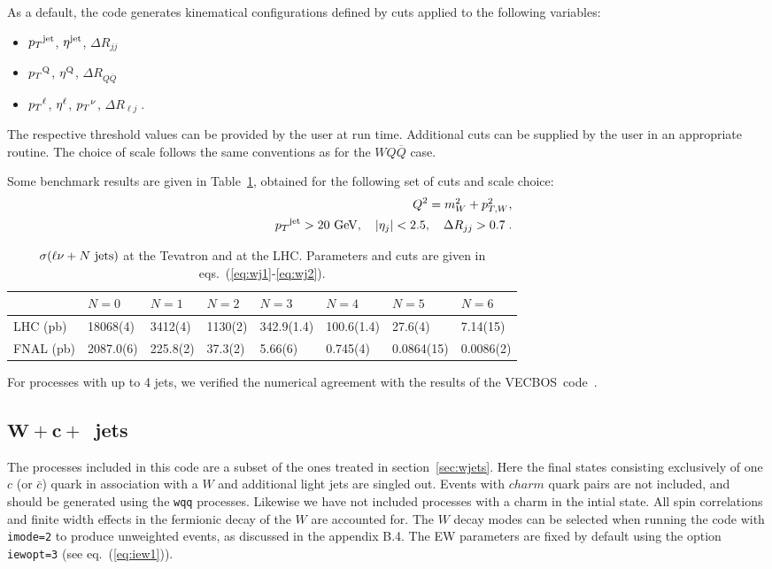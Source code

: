 \documentclass[paper]{JHEP3}
\newcommand{\gev}{\mbox{GeV}}
\newcommand{\ccaption}[2]{
    \begin{center}
    \parbox{0.85\textwidth}{
      \caption[#1]{\small{{#2}}}
      }
    \end{center}
    }
\def    \ba             {\begin{eqnarray}}
\def    \ea             {\end{eqnarray}}
\def    \gev            {\mbox{$\mathrm{GeV}$}}
\def    \Qbar   {\overline{Q}}
\def    \mWsq             {\mbox{$m_W^2$} }
\def    \pt             {\mbox{$p_T$}}
\def    \ptWsq           {\mbox{$p^2_{T,W}$}}
\def\vecbos{{\small VECBOS}}
\begin{document}
As a default, the code generates kinematical configurations defined by
cuts applied to the following variables:
\begin{itemize}
\item $\pt^{\rm jet}$, $\eta^{\rm jet}$, $\Delta R_{jj}$
\item $\pt^{\rm Q}$, $\eta^{\rm Q}$, $\Delta R_{Q\Qbar}$ 
\item $\pt^{\rm \ell}$, $\eta^{\rm \ell}$, $\pt^{\rm \nu}$, $\Delta
  R_{\ell j} \; . $
\end{itemize}
The respective threshold values can be provided by the user at run
time. Additional cuts can be supplied by the user in an appropriate
routine. 
The choice of scale follows the same conventions as for the $WQ\Qbar$
case.


Some benchmark results are given in Table~\ref{tab:wjxs}, obtained
for the following set of cuts and scale choice:
\ba \label{eq:wj1}
&& Q^2 = \mWsq + \ptWsq,
\\
        && \pt^{\rm jet}>20~\gev, \quad \vert \eta_j\vert < 2.5, \quad \Delta
        R_{jj} >0.7 \; .
\label{eq:wj2}
\ea

{\renewcommand{\arraystretch}{1.2}
\begin{table}
\begin{center}
\begin{tabular}{||l|l|l|l|l|l|l|l||}\hline
 & $N = 0$ & $N = 1$ & $N = 2$  & $N = 3$ & $N = 4$ & $N = 5$ & $N = 6$
\\ \hline
LHC (pb) & 18068(4) & 3412(4) & 1130(2) & 342.9(1.4) & 100.6(1.4) & 27.6(4) & 7.14(15)
                 \\  \hline
FNAL (pb)  & 2087.0(6) & 225.8(2) & 37.3(2) &  5.66(6) & 0.745(4) & 0.0864(15) & 0.0086(2)
\\ \hline
\end{tabular}           
\ccaption{}{\label{tab:wjxs} $\sigma(\ell \nu + N~{\rm jets})$
at the Tevatron and 
at the LHC. Parameters and cuts are given
in eqs.~(\ref{eq:wj1}-\ref{eq:wj2}).}
\end{center}
\end{table}}
For processes with up to 4 jets, we verified the numerical agreement
with the results of the \vecbos\ code~\cite{Berends:1991ax}.


\subsection{$\mathbf{W+c+}$~jets}
\label{sec:wcjets}
The processes included in this code are a subset of the ones 
treated in section~\ref{sec:wjets}. Here the final states consisting 
exclusively of one $c$ (or $\bar c$) quark in association with a 
$W$ and additional light jets 
are singled out. Events with $charm$ quark pairs are not included, and
should be generated using the {\tt wqq} processes. Likewise we have
not included processes with a charm in
the intial state.
All spin correlations and finite width effects in the fermionic decay
of the $W$ are 
accounted for. The $W$ decay modes can be selected when running 
the code with {\tt imode=2} to produce unweighted events, as discussed
in the appendix B.4. 
The EW parameters are fixed by default using the option {\tt iewopt=3}
(see eq.~(\ref{eq:iew1})).
\end{document}
